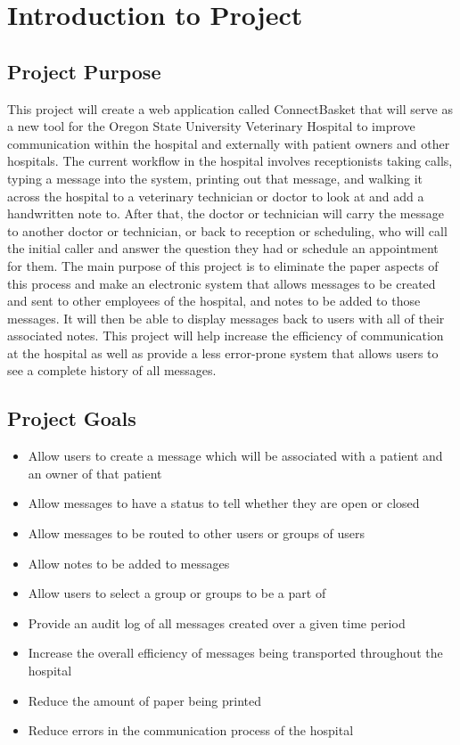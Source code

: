 \documentclass[onecolumn, draftclsnofoot,10pt, compsoc]{IEEEtran}
\begin{document}

\section{Introduction to Project}

\subsection{Project Purpose}
This project will create a web application called ConnectBasket that will serve as a new tool for the Oregon State University Veterinary Hospital to improve communication within the hospital and externally with patient owners and other hospitals. The current workflow in the hospital involves receptionists taking calls, typing a message into the system, printing out that message, and walking it across the hospital to a veterinary technician or doctor to look at and add a handwritten note to. After that, the doctor or technician will carry the message to another doctor or technician, or back to reception or scheduling, who will call the initial caller and answer the question they had or schedule an appointment for them. The main purpose of this project is to eliminate the paper aspects of this process and make an electronic system that allows messages to be created and sent to other employees of the hospital, and notes to be added to those messages. It will then be able to display messages back to users with all of their associated notes. This project will help increase the efficiency of communication at the hospital as well as provide a less error-prone system that allows users to see a complete history of all messages.

\subsection{Project Goals}
\begin{itemize}
\item Allow users to create a message which will be associated with a patient and an owner of that patient
\item Allow messages to have a status to tell whether they are open or closed
\item Allow messages to be routed to other users or groups of users
\item Allow notes to be added to messages
\item Allow users to select a group or groups to be a part of
\item Provide an audit log of all messages created over a given time period
\item Increase the overall efficiency of messages being transported throughout the hospital 
\item Reduce the amount of paper being printed
\item Reduce errors in the communication process of the hospital 
\end{itemize}
\end{document}
